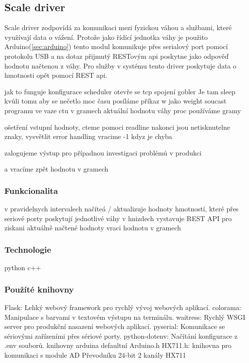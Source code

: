 

\subsection{Scale driver}\label{subsec:scale-driver}
Scale driver zodpovídá za komunikaci mezi fyzickou váhou a službami, které využívají data o vážení.\newline
Protože jako řídící jednotka váhy je použito Arduino(\ref{sec:arduino}) tento modul komunikuje přes serialový port pomocí protokolu USB a na dotaz přijmutý RESTovým api poskytne jako odpověď hodnotu načtenou z váhy.
Pro služby v systému tento driver poskytuje data o hmotnosti opět pomocí REST api.

jak to funguje
konfigurace
scheduler
otevře se tcp spojení
gobler
Je tam sleep kvůli tomu aby se nečetlo moc času
posíláme příkaz w jako weight soucast programu ve vaze
ctu v gramech aktuální hodnotu váhy
proc používáme gramy

ošetření vstupní hodnoty, cteme pomoci readline nakonci jsou netisknutelne znaky, vysvětlit error handling
vracime -1 kdyz je chyba

zalogujeme výstup pro případnou investigaci problémů v produkci

a vracíme zpět hodnotu v gramech


\subsubsection{Funkcionalita}
v pravidelnych intervalech načíteá / aktualizuje hodnoty
hmotností, které přes seriové porty poskytují jednotlivé váhy v hnizdech
vystavuje REST API pro ziskani aktuálně načtené hodnoty
vraci hodnotu v gramech

\subsubsection{Technologie}
python
c++

\subsubsection{Použíté knihovny}
Flask: Lehký webový framework pro rychlý vývoj webových
aplikací.
colorama: Manipulace s barvami v textovém výstupu na
terminálu.
waitress: Rychlý WSGI server pro produkční nasazení webových
aplikací.
pyserial: Komunikace se sériovými zařízeními přes sériové
porty.
python-dotenv: Načítání konfigurace z .env souborů.
knihovny arduina
defaultní Arduino.h
HX711.h: knihovna pro komunikaci s module AD Převodníku
24-bit 2 kanály HX711

